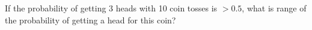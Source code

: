 If the probability of getting 3 heads with 10 coin tosses
is $> 0.5$, what is range of the probability of getting a head for this coin?
